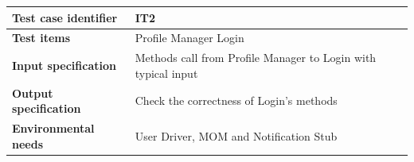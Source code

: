 \documentclass{article}
\begin{document}
				\bigskip
				\begin{center}
					\setlength{\tabcolsep}{24pt}
					\renewcommand{\arraystretch}{1.4}
					\begin{tabular}{ | l | p{8cm} |}\hline
						\textbf{Test case identifier} & IT2\\\hline
						\textbf{Test items} & Profile Manager \textrightarrow Login\\\hline
						\textbf{Input specification} & Methods call from Profile Manager to Login with typical input \\\hline
						\textbf{Output specification} & Check the correctness of Login's methods \\\hline
						\textbf{Environmental needs} & User Driver, MOM and Notification Stub\\\hline
					\end{tabular}
				\end{center}
\end{document}
